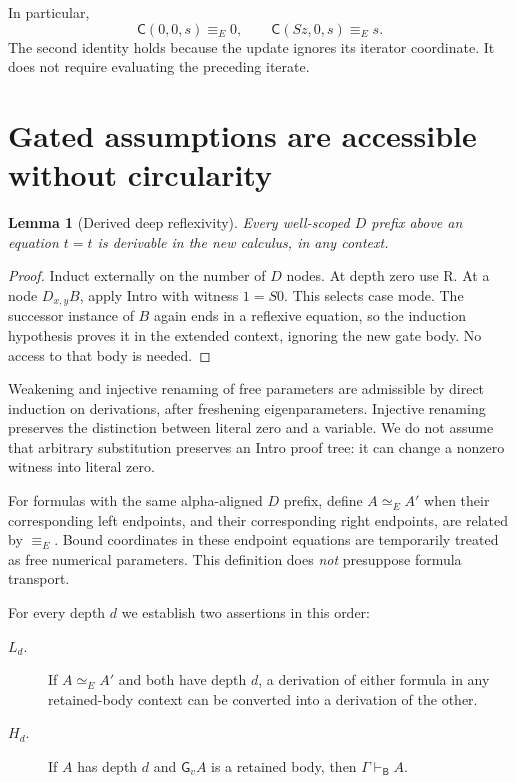 \documentclass[11pt]{article}
\newtheorem{lemma}[theorem]{Lemma}
\theoremstyle{definition}
\theoremstyle{remark}
\newcommand{\Bprf}{\mathsf{B}}
\newcommand{\sel}{\mathsf{C}}
\newcommand{\gate}{\mathsf{G}}
\newcommand{\entB}{\vdash_{\Bprf}}
\newcommand{\eqvE}{\mathrel{\simeq_E}}
\newcommand{\EqE}{\mathrel{\equiv_E}}
\begin{document}
In particular,
\[
 \sel(0,0,s)\EqE 0,\qquad
 \sel(Sz,0,s)\EqE s.
 \tag{Endpoints}
\]
The second identity holds because the update ignores its iterator
coordinate. It does not require evaluating the preceding iterate.

\section{Gated assumptions are accessible without circularity}
\label{sec:access}

\begin{lemma}[Derived deep reflexivity]
Every well-scoped $D$ prefix above an equation $t=t$ is derivable in the
new calculus, in any context.
\end{lemma}
\begin{proof}
Induct externally on the number of $D$ nodes. At depth zero use R. At a
node $D_{x,y}B$, apply Intro with witness $1=S0$. This selects case mode.
The successor instance of $B$ again ends in a reflexive equation, so the
induction hypothesis proves it in the extended context, ignoring the
new gate body. No access to that body is needed.
\end{proof}

Weakening and injective renaming of free parameters are admissible by
direct induction on derivations, after freshening eigenparameters.
Injective renaming preserves the distinction between literal zero and a
variable. We do not assume that arbitrary substitution preserves an
Intro proof tree: it can change a nonzero witness into literal zero.

For formulas with the same alpha-aligned $D$ prefix, define
$A\eqvE A'$ when their corresponding left endpoints, and their
corresponding right endpoints, are related by $\EqE$. Bound coordinates
in these endpoint equations are temporarily treated as free numerical
parameters. This definition does \emph{not} presuppose formula transport.

For every depth $d$ we establish two assertions in this order:
\begin{description}
\item[$L_d$.] If $A\eqvE A'$ and both have depth $d$, a derivation of
either formula in any retained-body context can be converted into a
derivation of the other.
\item[$H_d$.] If $A$ has depth $d$ and $\gate_v A$ is a retained body,
then $\Gamma\entB A$.
\end{description}
\end{document}
